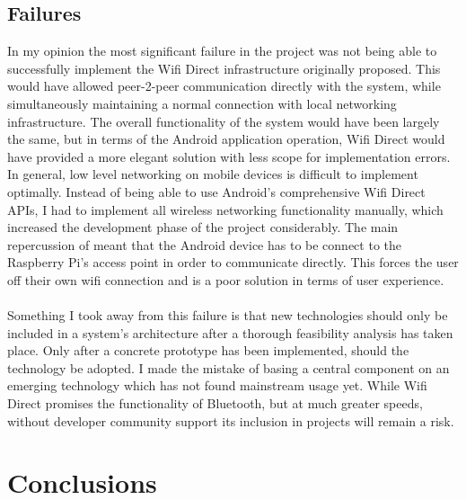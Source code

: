 \documentclass{article}
\begin{document}
\subsection{Failures}
In my opinion the most significant failure in the project was not being able to successfully implement the Wifi Direct infrastructure originally proposed. This would have allowed peer-2-peer communication directly with the system, while simultaneously maintaining a normal connection with local networking infrastructure. The overall functionality of the system would have been largely the same, but in terms of the Android application operation, Wifi Direct would have provided a more elegant solution with less scope for implementation errors. In general, low level networking on mobile devices is difficult to implement optimally. Instead of being able to use Android\rq s comprehensive Wifi Direct APIs, I had to implement all wireless networking functionality manually, which increased the development phase of the project considerably. The main repercussion of meant that the Android device has to be connect to the Raspberry Pi\rq s access point in order to communicate directly. This forces the user off their own wifi connection and is a poor solution in terms of user experience. \\\\
Something I took away from this failure is that new technologies should only be included in a system\rq s architecture after a thorough feasibility analysis has taken place. Only after a concrete prototype has been implemented, should the technology be adopted. I made the mistake of basing a central component on an emerging technology which has not found mainstream usage yet. While Wifi Direct promises the functionality of Bluetooth, but at much greater speeds, without developer community support its inclusion in projects will remain a risk. 

\section{Conclusions}
\end{document}
